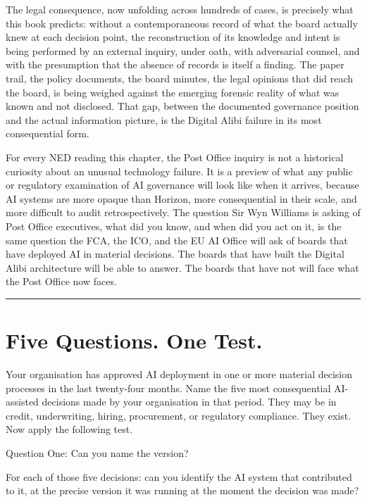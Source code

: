 The legal consequence, now unfolding across hundreds of cases, is precisely what this book predicts: without a contemporaneous record of what the board actually knew at each decision point, the reconstruction of its knowledge and intent is being performed by an external inquiry, under oath, with adversarial counsel, and with the presumption that the absence of records is itself a finding. The paper trail, the policy documents, the board minutes, the legal opinions that did reach the board, is being weighed against the emerging forensic reality of what was known and not disclosed. That gap, between the documented governance position and the actual information picture, is the Digital Alibi failure in its most consequential form.

For every NED reading this chapter, the Post Office inquiry is not a historical curiosity about an unusual technology failure. It is a preview of what any public or regulatory examination of AI governance will look like when it arrives, because AI systems are more opaque than Horizon, more consequential in their scale, and more difficult to audit retrospectively. The question Sir Wyn Williams is asking of Post Office executives, what did you know, and when did you act on it, is the same question the FCA, the ICO, and the EU AI Office will ask of boards that have deployed AI in material decisions. The boards that have built the Digital Alibi architecture will be able to answer. The boards that have not will face what the Post Office now faces.

\begin{center}\rule{0.5\linewidth}{0.5pt}\end{center}

\section{Five Questions. One Test.}

Your organisation has approved AI deployment in one or more material decision processes in the last twenty-four months. Name the five most consequential AI-assisted decisions made by your organisation in that period. They may be in credit, underwriting, hiring, procurement, or regulatory compliance. They exist. Now apply the following test.

Question One: Can you name the version?

For each of those five decisions: can you identify the AI system that contributed to it, at the precise version it was running at the moment the decision was made?


